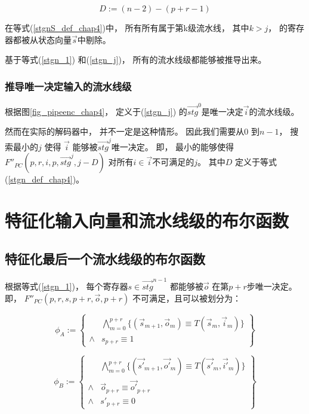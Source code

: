 \begin{equation}\label{stgn_def_chap4}
D              :=  (n-2)-(p+r-1)
\end{equation}

在等式(\ref{stgnS_def_chap4})中，
所有所有属于第k级流水线，
其中$k>j$，
的寄存器都被从状态向量$\vec{s}$中剔除。

基于等式(\ref{stgn_1}) 和(\ref{stgn_j})，
所有的流水线级都能够被推导出来。

\subsubsection{推导唯一决定输入的流水线级}\label{subsec_inferinput}

根据图\ref{fig_pipeenc_chap4}，
 定义于(\ref{stgn_j}) 的$\vec{stg}^0$是唯一决定$\vec{i}$的流水线级。

然而在实际的解码器中，
并不一定是这种情形。
因此我们需要从$0$ 到$n-1$，
搜索最小的$j$ 使得
$\vec{i}$ 能够被$\vec{stg}^j$唯一决定。
即，
最小的能够使得$F''_{PC}(p,r,i,p,\vec{stg}^{j},j-D)$ 对所有$i\in \vec{i}$不可满足的$j$。
其中$D$ 定义于等式(\ref{stgn_def_chap4})。

\section{特征化输入向量和流水线级的布尔函数}\label{sec_char_chap4}
\subsection{特征化最后一个流水线级的布尔函数}

根据等式(\ref{stgn_1})，
每个寄存器$s\in \vec{stg}^{n-1}$ 都能够被$\vec{o}$ 在第$p+r$步唯一决定。
即，
$F''_{PC}(p,r,s,p+r,\vec{o},p+r)$ 不可满足，且可以被划分为：

\begin{equation}
 \phi_A :=
 \left\{
\begin{array}{cc}
&\bigwedge_{m=0}^{p+r}
\{
(\vec{s}_{m+1},\vec{o}_m)\equiv T(\vec{s}_m,\vec{i}_m)
\}
\\
\wedge& s_{p+r}\equiv 1
\end{array}
\right\}
\end{equation}

\begin{equation}
\phi_B :=
\left\{
\begin{array}{cc}
&\bigwedge_{m=0}^{p+r}
\{
(\vec{s'}_{m+1},\vec{o'}_m)\equiv T(\vec{s'}_m,\vec{i'}_m)
\}
\\
\wedge&\vec{o}_{p+r}\equiv \vec{o'}_{p+r} \\
\wedge& s'_{p+r}\equiv 0
\end{array}
\right\}
\end{equation}

